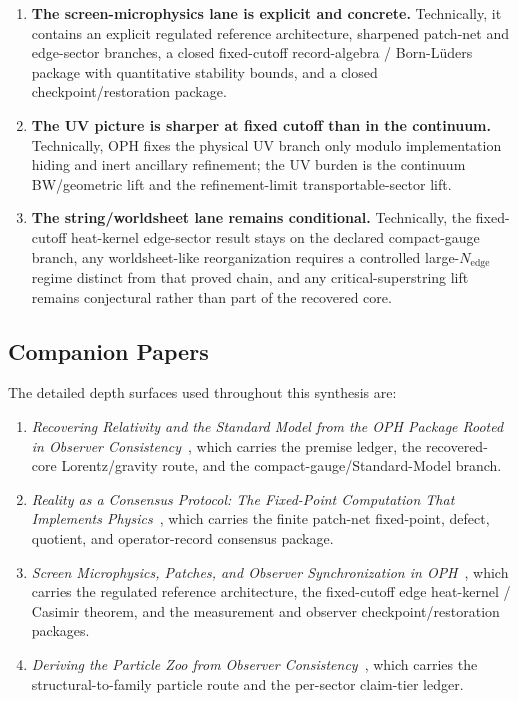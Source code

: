 \documentclass[11pt]{article}
\begin{document}
\begin{enumerate}[leftmargin=2em]
trunk and the gravity-side bridge candidate.
\item \textbf{The screen-microphysics lane is explicit and concrete.} Technically, it
contains an explicit regulated reference architecture, sharpened patch-net and edge-sector
branches, a closed fixed-cutoff record-algebra / Born-L\"uders package with quantitative stability
bounds, and a closed checkpoint/restoration package.
\item \textbf{The UV picture is sharper at fixed cutoff than in the continuum.} Technically, OPH
fixes the physical UV branch only modulo implementation hiding and inert ancillary refinement; the
UV burden is the continuum BW/geometric lift and the refinement-limit transportable-sector
lift.
\item \textbf{The string/worldsheet lane remains conditional.} Technically, the fixed-cutoff
heat-kernel edge-sector result stays on the declared compact-gauge branch, any worldsheet-like
reorganization requires a controlled large-\(N_{\mathrm{edge}}\) regime distinct from that proved
chain, and any critical-superstring lift remains conjectural rather than part of the recovered core.
\end{enumerate}

\subsection*{Companion Papers}

The detailed depth surfaces used throughout this synthesis are:
\begin{enumerate}[leftmargin=2em]
\item \emph{Recovering Relativity and the Standard Model from the OPH Package Rooted in Observer Consistency}~\cite{ophcompact}, which carries the premise ledger, the recovered-core Lorentz/gravity route, and the compact-gauge/Standard-Model branch.
\item \emph{Reality as a Consensus Protocol: The Fixed-Point Computation That Implements Physics}~\cite{ophconsensus}, which carries the finite patch-net fixed-point, defect, quotient, and operator-record consensus package.
\item \emph{Screen Microphysics, Patches, and Observer Synchronization in OPH}~\cite{ophmicrophysics}, which carries the regulated reference architecture, the fixed-cutoff edge heat-kernel / Casimir theorem, and the measurement and observer checkpoint/restoration packages.
\item \emph{Deriving the Particle Zoo from Observer Consistency}~\cite{ophparticles}, which carries the structural-to-family particle route and the per-sector claim-tier ledger.
\end{enumerate}

\def\OPHSkipEmbeddedReferences{1}



\appendix


\end{document}
